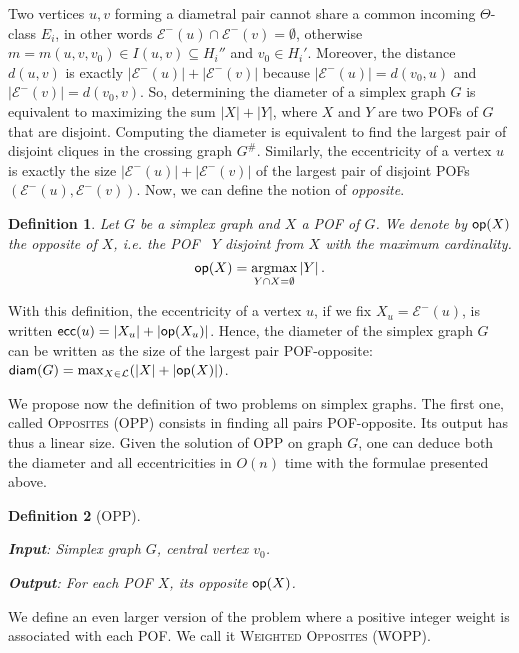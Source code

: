 \documentclass{article}
\DeclareMathOperator*{\argmax}{argmax}
\newtheorem{definition}{Definition}
\newcommand{\card}[1]{\left| #1 \right|}
\newcommand{\diam}{\mbox{\textsf{diam}}}
\newcommand{\ecc}{\mbox{\textsf{ecc}}}
\newcommand{\opp}{\mbox{\textsf{op}}}
\begin{document}
Two vertices $u,v$ forming a diametral pair cannot share a common incoming $\Theta$-class $E_i$, in other words $\mathcal{E}^-(u) \cap \mathcal{E}^-(v) = \emptyset$, otherwise $m = m(u,v,v_0) \in I(u,v) \subseteq H_i''$ and $v_0 \in H_i'$. Moreover, the distance $d(u,v)$ is exactly $\card{\mathcal{E}^-(u)} + \card{\mathcal{E}^-(v)}$ because $\card{\mathcal{E}^-(u)} = d(v_0,u)$ and $\card{\mathcal{E}^-(v)} = d(v_0,v)$. So, determining the diameter of a simplex graph $G$ is equivalent to maximizing the sum $\card{X} + \card{Y}$, where $X$ and $Y$ are two POFs of $G$ that are disjoint. Computing the diameter is equivalent to find the largest pair of disjoint cliques in the crossing graph $G^{\#}$. Similarly, the eccentricity of a vertex $u$ is exactly the size $\card{\mathcal{E}^-(u)} + \card{\mathcal{E}^-(v)}$ of the largest pair of disjoint POFs $(\mathcal{E}^-(u),\mathcal{E}^-(v))$.
Now, we can define the notion of \textit{opposite}.

\begin{definition}
Let $G$ be a simplex graph and $X$ a POF of $G$. We denote by $\opp(X)$ the \textit{opposite} of $X$, {\em i.e.} the POF~ $Y$ disjoint from $X$ with the maximum cardinality.
\[
\opp(X) = \argmax_{Y \cap X = \emptyset} \card{Y}.
\]
\label{def:opposite}
\end{definition}

With this definition, the eccentricity of a vertex $u$, if we fix $X_u = \mathcal{E}^-(u)$, is written $\ecc(u) = \card{X_u} + \card{\opp(X_u)}$. Hence, the diameter of the simplex graph $G$ can be written as the size of the largest pair POF-opposite: $\diam(G) = \max_{X\in \mathcal{L}}( \card{X} + \card{\opp(X)})$.

We propose now the definition of two problems on simplex graphs. The first one, called \textsc{Opposites} (OPP) consists in finding all pairs POF-opposite. Its output has thus a linear size. Given the solution of OPP on graph $G$, one can deduce both the diameter and all eccentricities in $O(n)$ time with the formulae presented above.

\begin{definition}[OPP]~

\textbf{Input}: Simplex graph $G$, central vertex $v_0$.

\textbf{Output}: For each POF $X$, its opposite $\opp(X)$.
\label{def:dpp}
\end{definition}

We define an even larger version of the problem where a positive integer weight is associated with each POF. We call it \textsc{Weighted Opposites} (WOPP).
\end{document}
